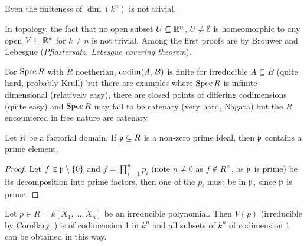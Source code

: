 \documentclass[a4paper,parskip=half,numbers=enddot, DIV=12]{scrreprt}
\begin{document}
	\begin{rem*}
		\begin{alphanumerate}
			\item Even the finiteness of $\dim(k^n)$ is not trivial. 
			\item In topology, the fact that no open subset $U\subseteq \mathbb{R}^n$, $U\neq \emptyset$ is homeomorphic to any open $V\subseteq \mathbb{R}^k$ for $k\neq n$ is not trivial. Among the first proofs are by Brouwer and Lebesgue (\emph{Pflastersatz, Lebesgue covering theorem}).
			\item For $\operatorname{Spec} R$ with $R$ noetherian, $\operatorname{codim}(A,B)$ is finite for irreducible $A\subseteq B$ (quite hard, probably Krull) but there are examples where $\operatorname{Spec} R$ is infinite-dimensional (relatively easy), there are closed points of differing codimensions (quite easy) and $\operatorname{Spec} R$ may fail to be catenary (very hard, Nagata) but the $R$ encountered in free nature are catenary.
		\end{alphanumerate}
		
	\end{rem*}
	\begin{lem}
		Let $R$ be a factorial domain. If $\mathfrak{p}\subseteq R$ is a non-zero prime ideal, then $\mathfrak{p}$ contains a prime element.
	\end{lem}
	\begin{proof}
		Let $f\in \mathfrak{p} \setminus \{0\}$ and $f = \prod_{i=1}^n p_i$ (note $n\neq 0$ as $f\not \in R^\times$, as $\mathfrak{p}$ is prime) be its decomposition into prime factors, then one of the $p_i$ must be in $\mathfrak{p}$, since $\mathfrak{p}$ is prime.
	\end{proof}
	\begin{prop}
		Let $p\in R=k[X_1,\ldots, X_n]$ be an irreducible polynomial. Then $V(p)$ (irreducible by Corollary~) is of codimension 1 in $k^n$ and all subsets of $k^n$ of codimension 1 can be obtained in this way.
	\end{prop}
\end{document}
